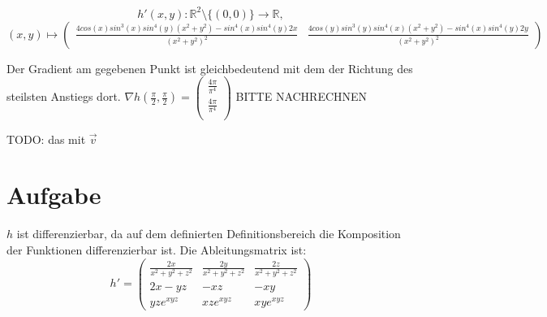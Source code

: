 \documentclass[10pt,a4paper,parskip=half]{scrartcl}
\newcommand{\vectwo}[2]{\left(\begin {array} {c} #1 \\ #2 \\ \end {array} \right)}
\begin{document}
\begin{enumerate}[(i)]
\[
h'(x,y): \mathbb{R}^2\setminus{\{(0,0)\}} \to \mathbb{R}, 
\]
\[
(x,y) \mapsto \left( \begin{array}{cc} 
\frac{4cos(x)sin^3(x)sin^4(y)(x^2 + y^2) - sin^4(x)sin^4(y)2x}{(x^2 + y^2)^2} &
\frac{4cos(y)sin^3(y)sin^4(x)(x^2 + y^2) - sin^4(x)sin^4(y)2y}{(x^2 + y^2)^2}
\end{array}\right)
\]

Der Gradient am gegebenen Punkt ist gleichbedeutend mit dem der Richtung des steilsten Anstiegs dort. \(\nabla h(\frac{\pi}{2},\frac{\pi}{2}) = \vectwo{\frac{4\pi}{\pi^4}}{\frac{4\pi}{\pi^4}}\) BITTE NACHRECHNEN

TODO: das mit \(\vec v \)

\section{Aufgabe}
$h$ ist differenzierbar, da auf dem definierten Definitionsbereich die Komposition der Funktionen differenzierbar ist. Die Ableitungsmatrix ist:
$$h' =\begin{pmatrix}
\frac{2x}{x^2 + y^2 + z^2} & \frac{2y}{x^2 + y^2 + z^2} & \frac{2z}{x^2 + y^2 + z^2} \\
2x - yz & -xz & -xy \\
yze^{xyz}  & xze^{xyz} & xye^{xyz} 
\end{pmatrix}  $$


\end{enumerate}
\end{document}
